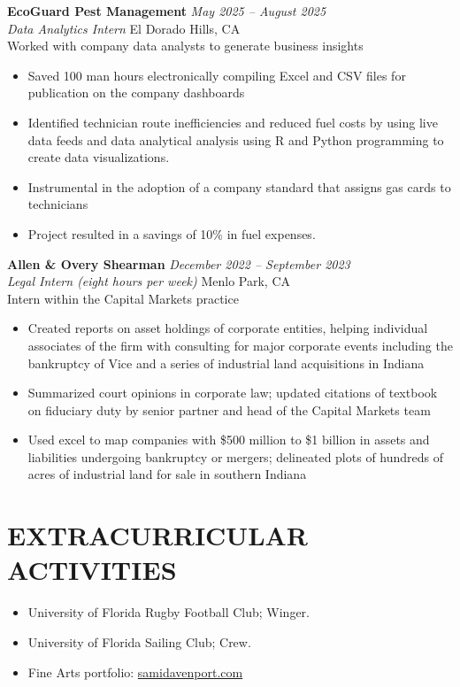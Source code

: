\documentclass[11pt,letterpaper]{article}
\begin{document}
	\textbf{EcoGuard Pest Management} \hfill \textit{May 2025 -- August 2025} \\
	\textit{Data Analytics Intern} \hfill El Dorado Hills, CA \\
	Worked with company data analysts to generate business insights
	\begin{itemize}
		\item Saved 100 man hours electronically compiling Excel and CSV files for publication on the company dashboards
		\item Identified technician route inefficiencies and reduced fuel costs by using live data feeds and data analytical analysis using R and Python programming to create data visualizations.
		\item Instrumental in the adoption of a company standard that assigns gas cards to technicians
		\item Project resulted in a savings of 10\% in fuel expenses.
	\end{itemize}
	
	\vspace{10pt}
	
	\noindent\textbf{Allen \& Overy Shearman} \hfill \textit{December 2022 -- September 2023} \\
	\textit{Legal Intern (eight hours per week)} \hfill Menlo Park, CA \\
	Intern within the Capital Markets practice
	\begin{itemize}
		\item Created reports on asset holdings of corporate entities, helping individual associates of the firm with consulting for major corporate events including the bankruptcy of Vice and a series of industrial land acquisitions in Indiana
		\item Summarized court opinions in corporate law; updated citations of textbook on fiduciary duty by senior partner and head of the Capital Markets team
		\item Used excel to map companies with \$500 million to \$1 billion in assets and liabilities undergoing bankruptcy or mergers; delineated plots of hundreds of acres of industrial land for sale in southern Indiana
	\end{itemize}
	
	\vspace{10pt}
	
	\section{EXTRACURRICULAR ACTIVITIES}
	\begin{itemize}
		\item University of Florida Rugby Football Club; Winger.
		\item University of Florida Sailing Club; Crew.
		\item Fine Arts portfolio: \href{https://samidavenport.com/}{samidavenport.com}
	\end{itemize}
	
\end{document}
